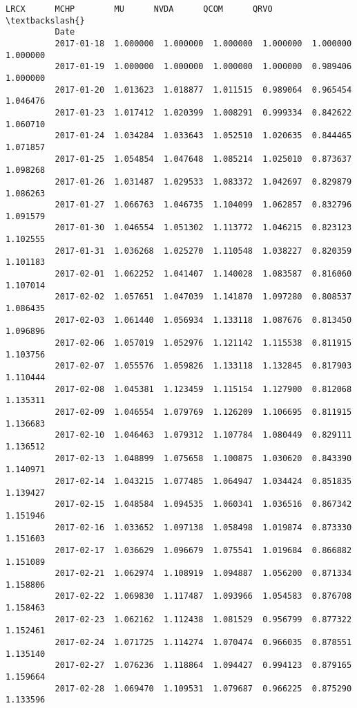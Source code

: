 \documentclass[11pt]{article}
\begin{document}
\begin{Verbatim}[commandchars=\\\{\}]
                          LRCX      MCHP        MU      NVDA      QCOM      QRVO  \textbackslash{}
          Date                                                                     
          2017-01-18  1.000000  1.000000  1.000000  1.000000  1.000000  1.000000   
          2017-01-19  1.000000  1.000000  1.000000  1.000000  0.989406  1.000000   
          2017-01-20  1.013623  1.018877  1.011515  0.989064  0.965454  1.046476   
          2017-01-23  1.017412  1.020399  1.008291  0.999334  0.842622  1.060710   
          2017-01-24  1.034284  1.033643  1.052510  1.020635  0.844465  1.071857   
          2017-01-25  1.054854  1.047648  1.085214  1.025010  0.873637  1.098268   
          2017-01-26  1.031487  1.029533  1.083372  1.042697  0.829879  1.086263   
          2017-01-27  1.066763  1.046735  1.104099  1.062857  0.832796  1.091579   
          2017-01-30  1.046554  1.051302  1.113772  1.046215  0.823123  1.102555   
          2017-01-31  1.036268  1.025270  1.110548  1.038227  0.820359  1.101183   
          2017-02-01  1.062252  1.041407  1.140028  1.083587  0.816060  1.107014   
          2017-02-02  1.057651  1.047039  1.141870  1.097280  0.808537  1.086435   
          2017-02-03  1.061440  1.056934  1.133118  1.087676  0.813450  1.096896   
          2017-02-06  1.057019  1.052976  1.121142  1.115538  0.811915  1.103756   
          2017-02-07  1.055576  1.059826  1.133118  1.132845  0.817903  1.110444   
          2017-02-08  1.045381  1.123459  1.115154  1.127900  0.812068  1.135311   
          2017-02-09  1.046554  1.079769  1.126209  1.106695  0.811915  1.136683   
          2017-02-10  1.046463  1.079312  1.107784  1.080449  0.829111  1.136512   
          2017-02-13  1.048899  1.075658  1.100875  1.030620  0.843390  1.140971   
          2017-02-14  1.043215  1.077485  1.064947  1.034424  0.851835  1.139427   
          2017-02-15  1.048584  1.094535  1.060341  1.036516  0.867342  1.151946   
          2017-02-16  1.033652  1.097138  1.058498  1.019874  0.873330  1.151603   
          2017-02-17  1.036629  1.096679  1.075541  1.019684  0.866882  1.151089   
          2017-02-21  1.062974  1.108919  1.094887  1.056200  0.871334  1.158806   
          2017-02-22  1.069830  1.117487  1.093966  1.054583  0.876708  1.158463   
          2017-02-23  1.062162  1.112438  1.081529  0.956799  0.877322  1.152461   
          2017-02-24  1.071725  1.114274  1.070474  0.966035  0.878551  1.135140   
          2017-02-27  1.076236  1.118864  1.094427  0.994123  0.879165  1.159664   
          2017-02-28  1.069470  1.109531  1.079687  0.966225  0.875290  1.133596   

\end{Verbatim}
\end{document}
